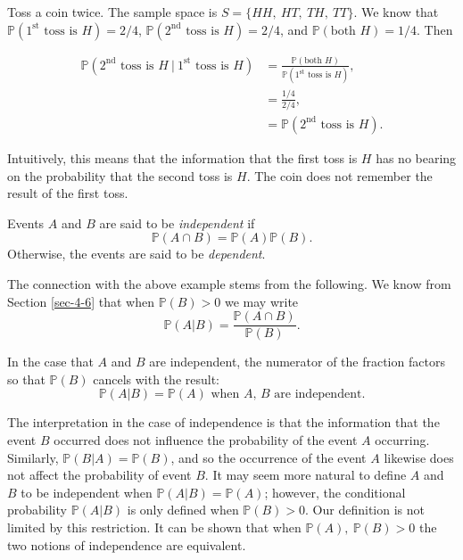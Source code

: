 Toss a coin twice. The sample space is \(S= \{ HH,\ HT,\ TH,\ TT \}
\). We know that \(\mathbb{P}(1^{\mathrm{st}}\mbox{ toss is }H)=2/4\),
\(\mathbb{P}(2^{\mathrm{nd}}\mbox{ toss is }H)=2/4\), and
\(\mathbb{P}(\mbox{both }H)=1/4\). Then

\begin{align*} 
\mathbb{P}(2^{\mathrm{nd}}\mbox{ toss is }H\ \vert \ 1^{\mathrm{st}}\mbox{ toss is }H) & =\frac{\mathbb{P}(\mbox{both }H)}{\mathbb{P}(1^{\mathrm{st}}\mbox{ toss is }H)}, \\
 & =\frac{1/4}{2/4},\\
 & =\mathbb{P}(2^{\mathrm{nd}}\mbox{ toss is }H).
\end{align*}

Intuitively, this means that the information that the first toss is
\(H\) has no bearing on the probability that the second toss is
\(H\). The coin does not remember the result of the first toss.

\begin{defn}
Events \(A\) and \(B\) are said to be \emph{independent} if 
\begin{equation}
\mathbb{P}(A\cap B)=\mathbb{P}(A)\mathbb{P}(B).
\end{equation}
Otherwise, the events are said to be \emph{dependent}. 
\end{defn}

The connection with the above example stems from the following. We
know from Section \ref{sec-4-6} that when
\(\mathbb{P}(B)>0\) we may write
\begin{equation}
\mathbb{P}(A|B)=\frac{\mathbb{P}(A\cap B)}{\mathbb{P}(B)}.
\end{equation}

In the case that \(A\) and \(B\) are independent, the numerator of the
fraction factors so that \(\mathbb{P}(B)\) cancels with the result:
\begin{equation}
\mathbb{P}(A|B)=\mathbb{P}(A)\mbox{ when \(A\), \(B\) are independent.}
\end{equation}

The interpretation in the case of independence is that the information
that the event \(B\) occurred does not influence the probability of
the event \(A\) occurring. Similarly,
\(\mathbb{P}(B|A)=\mathbb{P}(B)\), and so the occurrence of the event
\(A\) likewise does not affect the probability of event \(B\). It may
seem more natural to define \(A\) and \(B\) to be independent when
\(\mathbb{P}(A|B)=\mathbb{P}(A)\); however, the conditional
probability \(\mathbb{P}(A|B)\) is only defined when
\(\mathbb{P}(B)>0\). Our definition is not limited by this
restriction. It can be shown that when \(\mathbb{P}(A),\
\mathbb{P}(B)>0\) the two notions of independence are equivalent.

